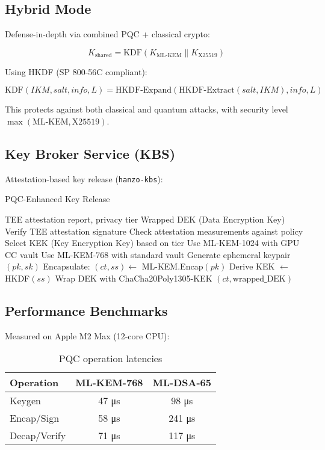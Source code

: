 \documentclass[11pt,twocolumn]{article}
\begin{document}
\subsection{Hybrid Mode}

Defense-in-depth via combined PQC + classical crypto:

\begin{equation}
K_{\text{shared}} = \text{KDF}(K_{\text{ML-KEM}} \parallel K_{\text{X25519}})
\end{equation}

Using HKDF (SP 800-56C compliant):

\begin{equation}
\text{KDF}(IKM, salt, info, L) = \text{HKDF-Expand}(\text{HKDF-Extract}(salt, IKM), info, L)
\end{equation}

This protects against both classical and quantum attacks, with security level $\max(\text{ML-KEM}, \text{X25519})$.

\subsection{Key Broker Service (KBS)}

Attestation-based key release (\texttt{hanzo-kbs}):

\begin{algorithm}
\caption{PQC-Enhanced Key Release}
\begin{algorithmic}[1]
\REQUIRE TEE attestation report, privacy tier
\ENSURE Wrapped DEK (Data Encryption Key)
\STATE Verify TEE attestation signature
\STATE Check attestation measurements against policy
\STATE Select KEK (Key Encryption Key) based on tier
    \STATE Use ML-KEM-1024 with GPU CC vault
\ELSE
    \STATE Use ML-KEM-768 with standard vault
\ENDIF
\STATE Generate ephemeral keypair $(pk, sk)$
\STATE Encapsulate: $(ct, ss) \leftarrow$ ML-KEM.Encap$(pk)$
\STATE Derive KEK $\leftarrow$ HKDF$(ss)$
\STATE Wrap DEK with ChaCha20Poly1305-KEK
\RETURN $(ct, \text{wrapped\_DEK})$
\end{algorithmic}
\end{algorithm}

\subsection{Performance Benchmarks}

Measured on Apple M2 Max (12-core CPU):

\begin{table}[h]
\centering
\small
\begin{tabular}{|l|c|c|}
\hline
\textbf{Operation} & \textbf{ML-KEM-768} & \textbf{ML-DSA-65} \\
\hline
Keygen & 47 μs & 98 μs \\
Encap/Sign & 58 μs & 241 μs \\
Decap/Verify & 71 μs & 117 μs \\
\hline
\end{tabular}
\caption{PQC operation latencies}
\label{tab:pqc_perf}
\end{table}
\end{document}
